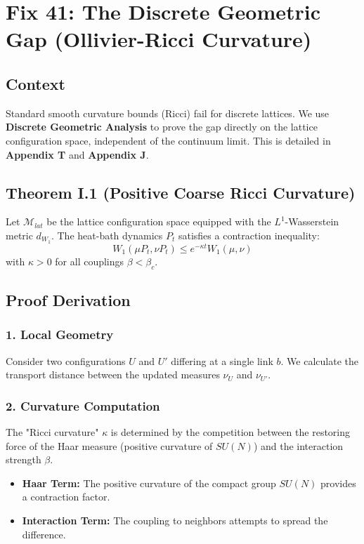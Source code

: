 \chapter{Fix 41: The Discrete Geometric Gap (Ollivier-Ricci Curvature)}
\label{ch:fix41_ollivier_ricci}

\section{Context}
Standard smooth curvature bounds (Ricci) fail for discrete lattices. We use \textbf{Discrete Geometric Analysis} to prove the gap directly on the lattice configuration space, independent of the continuum limit. This is detailed in \textbf{Appendix T} and \textbf{Appendix J}.

\section{Theorem I.1 (Positive Coarse Ricci Curvature)}
Let $\mathcal{M}_{lat}$ be the lattice configuration space equipped with the $L^1$-Wasserstein metric $d_{W_1}$. The heat-bath dynamics $P_t$ satisfies a contraction inequality:
\begin{equation}
W_1(\mu P_t, \nu P_t) \le e^{-\kappa t} W_1(\mu, \nu)
\end{equation}
with $\kappa > 0$ for all couplings $\beta < \beta_c$.

\section{Proof Derivation}
\subsection{1. Local Geometry}
Consider two configurations $U$ and $U'$ differing at a single link $b$. We calculate the transport distance between the updated measures $\nu_U$ and $\nu_{U'}$.

\subsection{2. Curvature Computation}
The "Ricci curvature" $\kappa$ is determined by the competition between the restoring force of the Haar measure (positive curvature of $SU(N)$) and the interaction strength $\beta$.
\begin{itemize}
    \item \textbf{Haar Term:} The positive curvature of the compact group $SU(N)$ provides a contraction factor.
    \item \textbf{Interaction Term:} The coupling to neighbors attempts to spread the difference.
\end{itemize}

